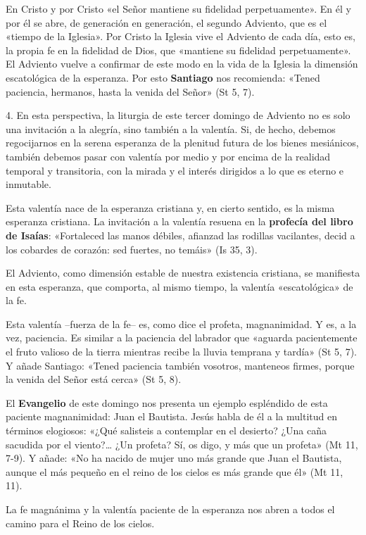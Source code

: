 \documentclass[]{article}
\begin{document}
En Cristo y por Cristo «el Señor mantiene su fidelidad perpetuamente».
En él y por él se abre, de generación en generación, el segundo
Adviento, que es el «tiempo de la Iglesia». Por Cristo la Iglesia vive
el Adviento de cada día, esto es, la propia fe en la fidelidad de Dios,
que «mantiene su fidelidad perpetuamente». El Adviento vuelve a
confirmar de este modo en la vida de la Iglesia la dimensión
escatológica de la esperanza. Por esto \textbf{Santiago} nos recomienda:
«Tened paciencia, hermanos, hasta la venida del Señor» (St 5, 7).

4. En esta perspectiva, la liturgia de este tercer domingo de Adviento
no es solo una invitación a la alegría, sino también a la valentía. Si,
de hecho, debemos regocijarnos en la serena esperanza de la plenitud
futura de los bienes mesiánicos, también debemos pasar con valentía por
medio y por encima de la realidad temporal y transitoria, con la mirada
y el interés dirigidos a lo que es eterno e inmutable.

Esta valentía nace de la esperanza cristiana y, en cierto sentido, es la
misma esperanza cristiana. La invitación a la valentía resuena en la
\textbf{profecía del libro de Isaías}: «Fortaleced las manos débiles,
afianzad las rodillas vacilantes, decid a los cobardes de corazón: sed
fuertes, no temáis» (Is 35, 3).

El Adviento, como dimensión estable de nuestra existencia cristiana, se
manifiesta en esta esperanza, que comporta, al mismo tiempo, la valentía
«escatológica» de la fe.

Esta valentía --fuerza de la fe-- es, como dice el profeta,
magnanimidad. Y es, a la vez, paciencia. Es similar a la paciencia del
labrador que «aguarda pacientemente el fruto valioso de la tierra
mientras recibe la lluvia temprana y tardía» (St 5, 7). Y añade
Santiago: «Tened paciencia también vosotros, manteneos firmes, porque la
venida del Señor está cerca» (St 5, 8).

El \textbf{Evangelio} de este domingo nos presenta un ejemplo espléndido
de esta paciente magnanimidad: Juan el Bautista. Jesús habla de él a la
multitud en términos elogiosos: «¿Qué salisteis a contemplar en el
desierto? ¿Una caña sacudida por el viento?\ldots{} ¿Un profeta? Sí, os
digo, y más que un profeta» (Mt 11, 7-9). Y añade: «No ha nacido de
mujer uno más grande que Juan el Bautista, aunque el más pequeño en el
reino de los cielos es más grande que él» (Mt 11, 11).

La fe magnánima y la valentía paciente de la esperanza nos abren a todos
el camino para el Reino de los cielos.
\end{document}
